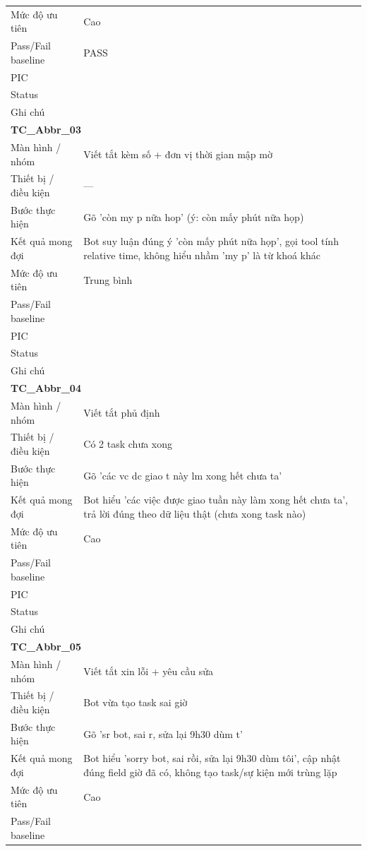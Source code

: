 \documentclass[12pt,a4paper]{article}
\begin{document}
\begin{longtable}{p{3.0cm}p{11.5cm}}
Mức độ ưu tiên & Cao \\
Pass/Fail baseline & PASS \\
PIC &  \\
Status &  \\
Ghi chú &  \\
\midrule
\multicolumn{2}{l}{\textbf{TC\_Abbr\_03}} \\
Màn hình / nhóm & Viết tắt kèm số + đơn vị thời gian mập mờ \\
Thiết bị / điều kiện & — \\
Bước thực hiện & Gõ 'còn my p nữa hop' (ý: còn mấy phút nữa họp) \\
Kết quả mong đợi & Bot suy luận đúng ý 'còn mấy phút nữa họp', gọi tool tính relative time, không hiểu nhầm 'my p' là từ khoá khác \\
Mức độ ưu tiên & Trung bình \\
Pass/Fail baseline &  \\
PIC &  \\
Status &  \\
Ghi chú &  \\
\midrule
\multicolumn{2}{l}{\textbf{TC\_Abbr\_04}} \\
Màn hình / nhóm & Viết tắt phủ định \\
Thiết bị / điều kiện & Có 2 task chưa xong \\
Bước thực hiện & Gõ 'các vc dc giao t này lm xong hết chưa ta' \\
Kết quả mong đợi & Bot hiểu 'các việc được giao tuần này làm xong hết chưa ta', trả lời đúng theo dữ liệu thật (chưa xong task nào) \\
Mức độ ưu tiên & Cao \\
Pass/Fail baseline &  \\
PIC &  \\
Status &  \\
Ghi chú &  \\
\midrule
\multicolumn{2}{l}{\textbf{TC\_Abbr\_05}} \\
Màn hình / nhóm & Viết tắt xin lỗi + yêu cầu sửa \\
Thiết bị / điều kiện & Bot vừa tạo task sai giờ \\
Bước thực hiện & Gõ 'sr bot, sai r, sửa lại 9h30 dùm t' \\
Kết quả mong đợi & Bot hiểu 'sorry bot, sai rồi, sửa lại 9h30 dùm tôi', cập nhật đúng field giờ đã có, không tạo task/sự kiện mới trùng lặp \\
Mức độ ưu tiên & Cao \\
Pass/Fail baseline &  \\

\end{longtable}
\end{document}

